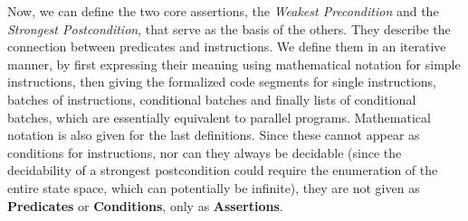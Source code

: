 Now, we can define the two core assertions, the \textit{Weakest Precondition} and the \textit{Strongest Postcondition}, that serve as the basis of the others. They describe the connection between predicates and instructions. We define them in an iterative manner, by first expressing their meaning using mathematical notation for simple instructions, then giving the formalized code segments for single instructions, batches of instructions, conditional batches and finally lists of conditional batches, which are essentially equivalent to parallel programs. Mathematical notation is also given for the last definitions.
Since these cannot appear as conditions for instructions, nor can they always be decidable (since the decidability of a strongest postcondition could require the enumeration of the entire state space, which can potentially be infinite), they are not given as \textbf{Predicates} or \textbf{Conditions}, only as \textbf{Assertions}.
